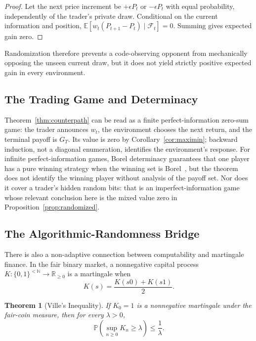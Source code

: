 \documentclass[aps,pra,reprint,superscriptaddress,amsmath,amssymb,floatfix]{revtex4-2}
\theoremstyle{plain}
\newtheorem{theorem}{Theorem}
\theoremstyle{definition}
\theoremstyle{remark}
\begin{document}
\begin{proof}
Let the next price increment be \(+\epsilon P_t\) or \(-\epsilon P_t\) with
equal probability, independently of the trader's private draw. Conditional on
the current information and position,
\(\mathbb{E}[w_t(P_{t+1}-P_t)\mid\mathcal{F}_t]=0\).
Summing gives expected gain zero.
\end{proof}

Randomization therefore prevents a code-observing opponent from mechanically
opposing the unseen current draw, but it does not yield strictly positive
expected gain in every environment.

\subsection{The Trading Game and Determinacy}

Theorem~\ref{thm:counterpath} can be read as a finite perfect-information
zero-sum game: the trader announces \(w_t\), the environment chooses the next
return, and the terminal payoff is \(G_T\). Its value is zero by
Corollary~\ref{cor:maximin}; backward induction, not a diagonal enumeration,
identifies the environment's response. For infinite perfect-information games,
Borel determinacy guarantees that one player has a pure winning strategy when
the winning set is Borel~\cite{Martin1975}, but the theorem does not identify
the winning player without analysis of the payoff set. Nor does it cover a
trader's hidden random bits: that is an imperfect-information game whose
relevant conclusion here is the mixed value zero in
Proposition~\ref{prop:randomized}.

\subsection{The Algorithmic-Randomness Bridge}

There is also a non-adaptive connection between computability and martingale
finance. In the fair binary market, a nonnegative capital process
\(K\colon\{0,1\}^{<\mathbb{N}}\to\mathbb{R}_{\geq0}\) is a martingale when
\begin{equation}
  K(s)=\frac{K(s0)+K(s1)}2.
  \label{eq:computablemartingale}
\end{equation}

\begin{theorem}[Ville's Inequality]
  \label{thm:ville}
  If \(K_0=1\) is a nonnegative martingale under the fair-coin measure, then
  for every \(\lambda>0\),
  \begin{equation}
    \mathbb{P}\!\left(\sup_{n\geq0}K_n\geq\lambda\right)
    \leq\frac1\lambda.
    \label{eq:ville}
  \end{equation}
\end{theorem}
\end{document}
